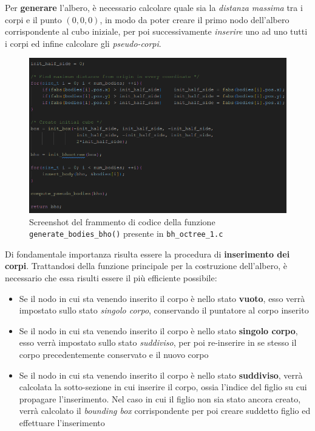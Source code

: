 \documentclass[12pt]{report}
\begin{document}
    Per \textbf{generare} l'albero, è necessario calcolare quale sia la \textit{distanza massima} tra i corpi e il punto $(0,0,0)$, in modo da poter creare il primo nodo dell'albero corrispondente al cubo iniziale, per poi successivamente \textit{inserire} uno ad uno tutti i corpi ed infine calcolare gli \textit{pseudo-corpi}.

    \begin{figure}[H]
        \centering
        \includegraphics[width=\textwidth]{images/gen_bodies.png}
        \caption{Screenshot del frammento di codice della funzione \texttt{generate\_bodies\_bho()} presente in \texttt{bh\_octree\_1.c}}
        \label{fig:gen_bodies}
    \end{figure}

    Di fondamentale importanza risulta essere la procedura di \textbf{inserimento dei corpi}. Trattandosi della funzione principale per la costruzione dell'albero, è necessario che essa risulti essere il più efficiente possibile:
    \begin{itemize}
        \item Se il nodo in cui sta venendo inserito il corpo è nello stato \textbf{vuoto}, esso verrà impostato sullo stato \textit{singolo corpo}, conservando il puntatore al corpo inserito
        \item Se il nodo in cui sta venendo inserito il corpo è nello stato \textbf{singolo corpo}, esso verrà impostato sullo stato \textit{suddiviso}, per poi re-inserire in se stesso il corpo precedentemente conservato e il nuovo corpo
        \newpage
        \item Se il nodo in cui sta venendo inserito il corpo è nello stato \textbf{suddiviso}, verrà calcolata la sotto-sezione in cui inserire il corpo, ossia l'indice del figlio su cui propagare l'inserimento. Nel caso in cui il figlio non sia stato ancora creato, verrà calcolato il \textit{bounding box} corrispondente per poi creare suddetto figlio ed effettuare l'inserimento
    \end{itemize}
\end{document}
